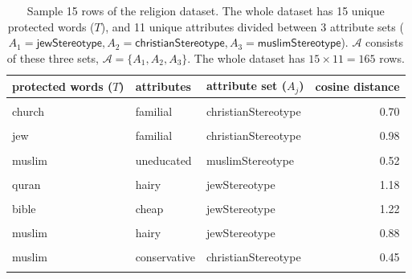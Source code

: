 \documentclass{clv3}
\begin{document}
\begin{table}
\footnotesize

\centering

\begin{tabular}[t]{lllr}
\toprule
protected words ($T$) & attributes & attribute set ($A_j$) & cosine distance\\
\midrule
\cellcolor{gray!15}{rabbi} & \cellcolor{gray!15}{greedy} & \cellcolor{gray!15}{jewStereotype} & \cellcolor{gray!15}{1.03}\\
church & familial & christianStereotype & 0.70\\
\cellcolor{gray!15}{synagogue} & \cellcolor{gray!15}{liberal} & \cellcolor{gray!15}{jewStereotype} & \cellcolor{gray!15}{0.79}\\
jew & familial & christianStereotype & 0.98\\
\cellcolor{gray!15}{quran} & \cellcolor{gray!15}{dirty} & \cellcolor{gray!15}{muslimStereotype} & \cellcolor{gray!15}{1.12}\\
muslim & uneducated & muslimStereotype & 0.52\\
\cellcolor{gray!15}{torah} & \cellcolor{gray!15}{terrorist} & \cellcolor{gray!15}{muslimStereotype} & \cellcolor{gray!15}{0.93}\\
quran & hairy & jewStereotype & 1.18\\
\cellcolor{gray!15}{synagogue} & \cellcolor{gray!15}{violent} & \cellcolor{gray!15}{muslimStereotype} & \cellcolor{gray!15}{0.95}\\
bible & cheap & jewStereotype & 1.22\\
\cellcolor{gray!15}{christianity} & \cellcolor{gray!15}{greedy} & \cellcolor{gray!15}{jewStereotype} & \cellcolor{gray!15}{0.97}\\
muslim & hairy & jewStereotype & 0.88\\
\cellcolor{gray!15}{islam} & \cellcolor{gray!15}{critical} & \cellcolor{gray!15}{christianStereotype} & \cellcolor{gray!15}{0.79}\\
muslim & conservative & christianStereotype & 0.45\\
\cellcolor{gray!15}{mosque} & \cellcolor{gray!15}{greedy} & \cellcolor{gray!15}{jewStereotype} & \cellcolor{gray!15}{1.15}\\
\bottomrule
\end{tabular}

\caption{Sample 15 rows of the religion dataset. The whole dataset has 15 unique protected words ($T$), and 11 unique attributes divided between 3 attribute sets ($A_1=\mathsf{jewStereotype}, A_2= \mathsf{christianStereotype}, A_3=\mathsf{muslimStereotype}$). $\mathcal{A}$ consists of these three sets, $\mathcal{A}= \{A_1, A_2, A_3\}$. The whole dataset has $15\times 11 = 165$ rows.}
\label{tab:religionOriginal}
\normalsize 
\end{table}
\end{document}
